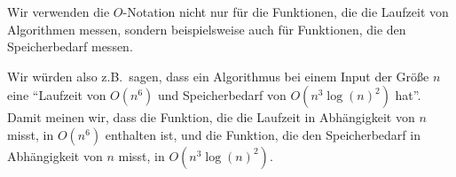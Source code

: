 \begin{remark}
    Wir verwenden die $O$-Notation nicht nur für die Funktionen, die die Laufzeit von Algorithmen messen, sondern beispielsweise auch für Funktionen, die den Speicherbedarf messen.

    Wir würden also z.B.\ sagen, dass ein Algorithmus bei einem Input der Größe $n$ eine \enquote{Laufzeit von $O(n^6)$ und Speicherbedarf von $O(n^3 \log(n)^2)$ hat}. Damit meinen wir, dass die Funktion, die die Laufzeit in Abhängigkeit von $n$ misst, in $O(n^6)$ enthalten ist, und die Funktion, die den Speicherbedarf in Abhängigkeit von $n$ misst, in $O(n^3\log(n)^2)$.
\end{remark}